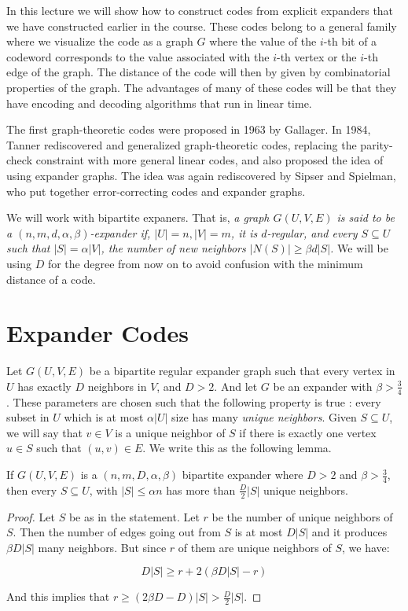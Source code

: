 
In this lecture we will show how to construct codes from explicit expanders that we have constructed earlier in the course. 
These codes belong to a general family where we visualize the code as a graph $G$ where the value of the $i$-th bit of a codeword corresponds to the value associated with the $i$-th vertex or the $i$-th edge of the graph. The distance of the code will then by given by combinatorial properties of the graph. The advantages of many of these codes will be that they have encoding and decoding algorithms that run in linear time.

The first graph-theoretic codes were proposed in 1963 by Gallager. In 1984, Tanner rediscovered and generalized graph-theoretic codes, replacing the parity-check constraint with more general linear codes, and also proposed the idea of using expander graphs. The idea
was again rediscovered by Sipser and Spielman, who put together error-correcting codes and expander graphs.

We will work with bipartite expaners. That is, \textit{a graph $G(U,V,E)$ is said to be a $(n,m,d,\alpha,\beta)$-expander if, $|U|=n,|V|=m$, it is $d$-regular, and every $S \subseteq U$ such that $|S| = \alpha|V|$, the number of new neighbors $|N(S)| \ge \beta d|S|$.} We will be using $D$ for the degree from now on to avoid confusion with the minimum distance of a code.

\section{Expander Codes}

Let $G(U,V,E)$ be a bipartite regular expander graph such that every vertex in $U$ has exactly $D$ neighbors in $V$, and $D > 2$. And let $G$ be an expander with $\beta > \frac{3}{4}$. These parameters are chosen such that the following property is true : every subset in $U$ which is at most $\alpha|U|$ size has many \textit{unique neighbors}. Given $S \subseteq U$, we will say that $v \in V$ is a unique neighbor of $S$ if there is exactly one vertex $u \in S$  such that $(u,v) \in E$. We write this as the following lemma.

\begin{lemma}
\label{lem:unique-neighbors}
If $G(U,V,E)$ is a $(n,m,D,\alpha,\beta)$ bipartite expander where $D > 2$ and $\beta > \frac{3}{4}$, then every $S \subseteq U$, with $|S| \le \alpha n$ has more than $\frac{D}{2}|S|$ unique neighbors.
\end{lemma}
\begin{proof}
Let $S$ be as in the statement. Let $r$ be the number of unique neighbors of $S$. Then the number of edges going out from $S$ is at most $D|S|$ and it produces $\beta D |S|$ many neighbors. But since $r$ of them are unique neighbors of $S$, we have: 

$$D |S| \ge r+ 2(\beta D|S|-r)$$

\noindent And this implies that $r \ge (2\beta D - D) |S| > \frac{D}{2}|S|$.
\end{proof}


